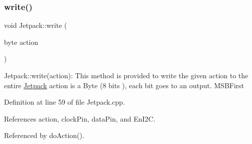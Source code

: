 \mbox{\label{classJetpack_a338f1af8cbc6504ac69b47c7328569b5}} 
\subsubsection{\texorpdfstring{write()}{write()}}
{\footnotesize\ttfamily void Jetpack\+::write (\begin{DoxyParamCaption}\item[{byte}]{action }\end{DoxyParamCaption})}

Jetpack\+::write(action)\+: This method is provided to write the given action to the entire \hyperlink{classJetpack}{Jetpack} action is a Byte (8 bits ), each bit goes to an output. M\+S\+B\+First 

Definition at line 59 of file Jetpack.\+cpp.



References action, clock\+Pin, data\+Pin, and En\+I2C.



Referenced by do\+Action().


